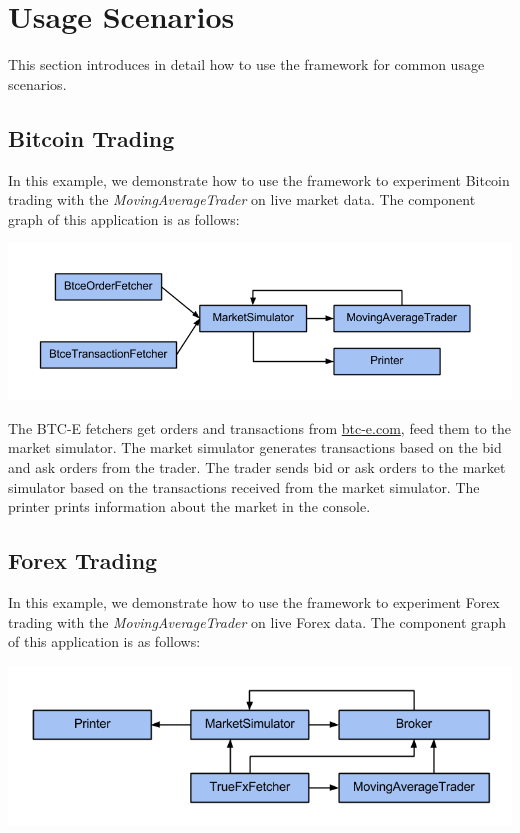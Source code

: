 \section{Usage Scenarios}
\label{sec:3}

This section introduces in detail how to use the framework for common usage scenarios.

\subsection{Bitcoin Trading}

In this example, we demonstrate how to use the framework to experiment Bitcoin trading with the \emph{MovingAverageTrader} on live market data. The component graph of this application is as follows:

\noindent
\includegraphics[width=\textwidth]{img/examples/btce}

The BTC-E fetchers get orders and transactions from \url{btc-e.com}, feed them to the market simulator. The market simulator generates transactions based on the bid and ask orders from the trader. The trader sends bid or ask orders to the market simulator based on the transactions received from the market simulator. The printer prints information about the market in the console.

\subsection{Forex Trading}

In this example, we demonstrate how to use the framework to experiment Forex trading with the \emph{MovingAverageTrader} on live Forex data. The component graph of this application is as follows:

\noindent
\includegraphics[width=\textwidth]{img/examples/forex-live}

